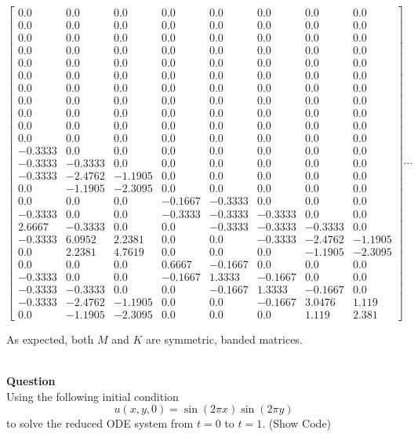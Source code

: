 \documentclass[12pt]{article}
\newcounter{question}
\newcounter{subquest}
\newcommand{\question}{
    \stepcounter{question} 
    \newpage
    \vspace{1.5em}
    \textbf{\\ \Large Question \thequestion \ }
    \vspace{.5em} 
    \setcounter{subquest}{0}\ \\}
\begin{document}
\[\left[\begin{matrix}0.0 & 0.0 & 0.0 & 0.0 & 0.0 & 0.0 & 0.0 & 0.0\\0.0 & 0.0 & 0.0 & 0.0 & 0.0 & 0.0 & 0.0 & 0.0\\0.0 & 0.0 & 0.0 & 0.0 & 0.0 & 0.0 & 0.0 & 0.0\\0.0 & 0.0 & 0.0 & 0.0 & 0.0 & 0.0 & 0.0 & 0.0\\0.0 & 0.0 & 0.0 & 0.0 & 0.0 & 0.0 & 0.0 & 0.0\\0.0 & 0.0 & 0.0 & 0.0 & 0.0 & 0.0 & 0.0 & 0.0\\0.0 & 0.0 & 0.0 & 0.0 & 0.0 & 0.0 & 0.0 & 0.0\\0.0 & 0.0 & 0.0 & 0.0 & 0.0 & 0.0 & 0.0 & 0.0\\0.0 & 0.0 & 0.0 & 0.0 & 0.0 & 0.0 & 0.0 & 0.0\\0.0 & 0.0 & 0.0 & 0.0 & 0.0 & 0.0 & 0.0 & 0.0\\0.0 & 0.0 & 0.0 & 0.0 & 0.0 & 0.0 & 0.0 & 0.0\\-0.3333 & 0.0 & 0.0 & 0.0 & 0.0 & 0.0 & 0.0 & 0.0\\-0.3333 & -0.3333 & 0.0 & 0.0 & 0.0 & 0.0 & 0.0 & 0.0\\-0.3333 & -2.4762 & -1.1905 & 0.0 & 0.0 & 0.0 & 0.0 & 0.0\\0.0 & -1.1905 & -2.3095 & 0.0 & 0.0 & 0.0 & 0.0 & 0.0\\0.0 & 0.0 & 0.0 & -0.1667 & -0.3333 & 0.0 & 0.0 & 0.0\\-0.3333 & 0.0 & 0.0 & -0.3333 & -0.3333 & -0.3333 & 0.0 & 0.0\\2.6667 & -0.3333 & 0.0 & 0.0 & -0.3333 & -0.3333 & -0.3333 & 0.0\\-0.3333 & 6.0952 & 2.2381 & 0.0 & 0.0 & -0.3333 & -2.4762 & -1.1905\\0.0 & 2.2381 & 4.7619 & 0.0 & 0.0 & 0.0 & -1.1905 & -2.3095\\0.0 & 0.0 & 0.0 & 0.6667 & -0.1667 & 0.0 & 0.0 & 0.0\\-0.3333 & 0.0 & 0.0 & -0.1667 & 1.3333 & -0.1667 & 0.0 & 0.0\\-0.3333 & -0.3333 & 0.0 & 0.0 & -0.1667 & 1.3333 & -0.1667 & 0.0\\-0.3333 & -2.4762 & -1.1905 & 0.0 & 0.0 & -0.1667 & 3.0476 & 1.119\\0.0 & -1.1905 & -2.3095 & 0.0 & 0.0 & 0.0 & 1.119 & 2.381\end{matrix}\right]\cdots\]

As expected, both $M$ and $K$ are symmetric, banded matrices.

\question
Using the following initial condition
\[u(x,y,0) = \sin(2 \pi x) \sin(2 \pi y)\]
to solve the reduced ODE system from $t=0$ to $t=1$. (Show Code)
\end{document}
